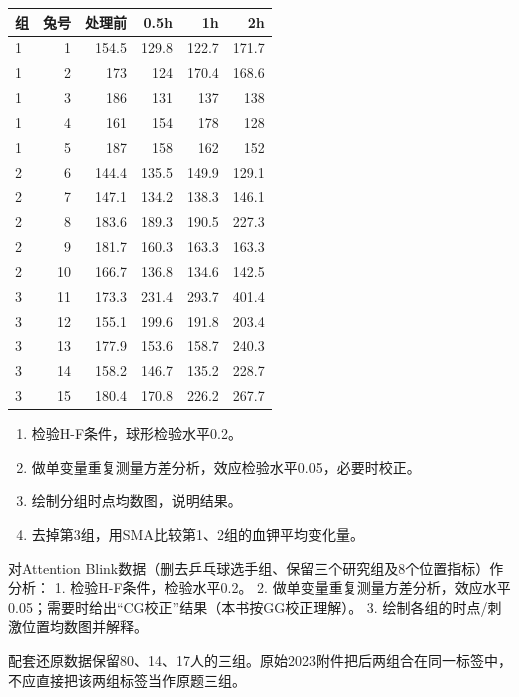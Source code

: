\begin{center}\small\setlength{\tabcolsep}{3.5pt}\renewcommand{\arraystretch}{1.18}\begin{tabular}{@{}lrrrrr@{}}
\toprule
组 & 兔号 & 处理前 & 0.5h & 1h & 2h \\
\midrule

1 & 1 & 154.5 & 129.8 & 122.7 & 171.7 \\
1 & 2 & 173 & 124 & 170.4 & 168.6 \\
1 & 3 & 186 & 131 & 137 & 138 \\
1 & 4 & 161 & 154 & 178 & 128 \\
1 & 5 & 187 & 158 & 162 & 152 \\
2 & 6 & 144.4 & 135.5 & 149.9 & 129.1 \\
2 & 7 & 147.1 & 134.2 & 138.3 & 146.1 \\
2 & 8 & 183.6 & 189.3 & 190.5 & 227.3 \\
2 & 9 & 181.7 & 160.3 & 163.3 & 163.3 \\
2 & 10 & 166.7 & 136.8 & 134.6 & 142.5 \\
3 & 11 & 173.3 & 231.4 & 293.7 & 401.4 \\
3 & 12 & 155.1 & 199.6 & 191.8 & 203.4 \\
3 & 13 & 177.9 & 153.6 & 158.7 & 240.3 \\
3 & 14 & 158.2 & 146.7 & 135.2 & 228.7 \\
3 & 15 & 180.4 & 170.8 & 226.2 & 267.7 \\
\bottomrule\end{tabular}\end{center}

\begin{enumerate}
\def\labelenumi{\arabic{enumi}.}
\tightlist
\item
  检验H-F条件，球形检验水平0.2。
\item
  做单变量重复测量方差分析，效应检验水平0.05，必要时校正。
\item
  绘制分组时点均数图，说明结果。
\item
  去掉第3组，用SMA比较第1、2组的血钾平均变化量。
\end{enumerate}



\par\addvspace{6pt}\noindent\begin{minipage}{\linewidth}


对Attention Blink数据（删去乒乓球选手组、保留三个研究组及8个位置指标）作分析： 1. 检验H-F条件，检验水平0.2。 2. 做单变量重复测量方差分析，效应水平0.05；需要时给出``CG校正''结果（本书按GG校正理解）。 3. 绘制各组的时点/刺激位置均数图并解释。

配套还原数据保留80、14、17人的三组。原始2023附件把后两组合在同一标签中，不应直接把该两组标签当作原题三组。



\end{minipage}\par\vspace{4pt}



